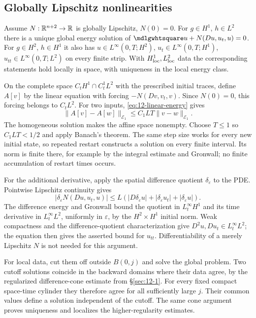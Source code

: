\subsection{Globally Lipschitz nonlinearities}
\begin{theorem}
Assume $N:\mathbb{R}^{n+2}\to\mathbb{R}$ is globally Lipschitz, $N(0)=0$.
For $g\in H^1$, $h\in L^2$ there is a unique global energy solution
of $\PDEWave u+N(Du,u_t,u)=0$. For $g\in H^2$, $h\in H^1$ it also has
$u\in L^\infty(0,T;H^2)$, $u_t\in L^\infty(0,T;H^1)$,
$u_{tt}\in L^\infty(0,T;L^2)$ on every finite strip.
With $H^1_{\rm loc},L^2_{\rm loc}$ data the corresponding statements
hold locally in space, with uniqueness in the local energy class.
\end{theorem}
\begin{expandedproof}
On the complete space $C_tH^1\cap C_t^1L^2$ with the prescribed
initial traces, define $A[v]$ by the linear equation with forcing
$-N(Dv,v_t,v)$. Since $N(0)=0$, this forcing belongs to $C_tL^2$.
For two inputs, \eqref{eq:12-linear-energy} gives
\[
 \|A[v]-A[w]\|_{\mathcal E_1}
 \le C_1LT\|v-w\|_{\mathcal E_1}.
\]
The homogeneous solution makes the affine space nonempty. Choose
$T\le1$ so $C_1LT<1/2$ and apply Banach's theorem.
The same step size works for every new initial state, so repeated
restart constructs a solution on every finite interval. Its norm is
finite there, for example by the integral estimate and Gronwall;
no finite accumulation of restart times occurs.

For the additional derivative, apply the spatial difference quotient
$\delta_\varepsilon$ to the PDE. Pointwise Lipschitz continuity gives
\[
 |\delta_\varepsilon N(Du,u_t,u)|
 \le L(|D\delta_\varepsilon u|+|\delta_\varepsilon u_t|
                                  +|\delta_\varepsilon u|).
\]
The difference energy and Gronwall bound the quotient in
$L^\infty_tH^1$ and its time derivative in $L^\infty_tL^2$,
uniformly in $\varepsilon$, by the $H^2\times H^1$ initial norm.
Weak compactness and the difference-quotient characterization give
$D^2u,Du_t\in L^\infty_tL^2$; the equation then gives the asserted
bound for $u_{tt}$. Differentiability of a merely Lipschitz $N$ is
not needed for this argument.

For local data, cut them off outside $B(0,j)$ and solve the global
problem. Two cutoff solutions coincide in the backward domains where
their data agree, by the regularized difference-cone estimate from
\S\ref{sec:12-1}. For every fixed compact space-time cylinder they
therefore agree for all sufficiently large $j$. Their common values
define a solution independent of the cutoff. The same cone argument
proves uniqueness and localizes the higher-regularity estimates.
\end{expandedproof}

